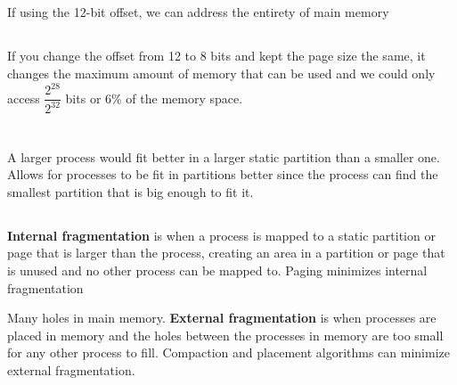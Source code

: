 \documentclass[11pt,letterpaper]{article}
\begin{document}
		\subsection{}
			\paragraph{}
			{
				If using the 12-bit offset, we can address the entirety of main memory
			}
		\subsection{}
			\paragraph{}
			{
				If you change the offset from 12 to 8 bits and kept the page size the same, it changes the maximum amount of memory that can be used and we could only access $\dfrac{2^{28}}{2^{32}}$ bits or 6\% of the memory space.
			}
	\section{}
		\subsection{}
			\paragraph{}
			{
				A larger process would fit better in a larger static partition than a smaller one. Allows for processes to be fit in partitions better since the process can find the smallest partition that is big enough to fit it.
			}
		\subsection{}
			\paragraph{}
			{
				\textbf{Internal fragmentation} is when a process is mapped to a static partition or page that is larger than the process, creating an area in a partition or page that is unused and no other process can be mapped to. Paging minimizes internal fragmentation
				
				Many holes in main memory. \textbf{External fragmentation} is when processes are placed in memory and the holes between the processes in memory are too small for any other process to fill. Compaction and placement algorithms can minimize external fragmentation.
			}
\end{document}
